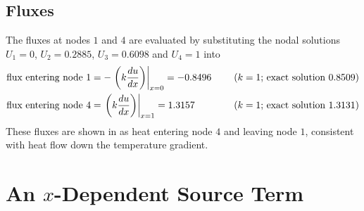 \subsection{Fluxes}

The fluxes at nodes $1$ and $4$ are evaluated by substituting the nodal solutions
$U_{1}=0$, $U_{2}=0.2885$, $U_{3}=0.6098$ and $U_{4}=1$ into 
\begin{alignat*}{2}
  \text{flux entering node $1$} &= - \left. \left( k \dfrac{ d u}{d x}  \right) \right|_{x=0}  = -0.8496
        && \quad \text{ ($k=1$; exact solution $0.8509$)}\\      
  \text{flux entering node $4$} &=  \left. \left( k \dfrac{ d u}{d x}  \right) \right|_{x=1}  = 1.3157
        && \quad \text{ ($k=1$; exact solution $1.3131$)}
\end{alignat*}       
These fluxes are shown in  as heat entering node $4$ 
and leaving node $1$, consistent with heat flow down the temperature gradient.

\section{An $x$-Dependent Source Term}

